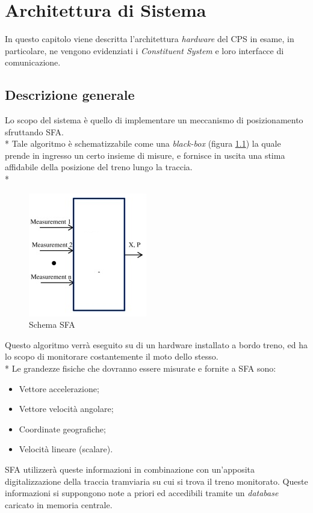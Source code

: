 \chapter{Architettura di Sistema}
In questo capitolo viene descritta l'architettura \emph{hardware} del CPS in esame, in particolare, ne vengono evidenziati i \emph{Constituent System} e loro interfacce di comunicazione.
\section{Descrizione generale}
Lo scopo del sistema \`e quello di implementare un meccanismo di posizionamento sfruttando SFA.\\*
Tale algoritmo \`e schematizzabile come una \emph{black-box} (figura \ref{fig:sfa}) la quale prende in ingresso un certo insieme di misure, e fornisce in uscita una stima affidabile della posizione del treno lungo la traccia.\\*
\begin{figure}[h]
	\centering
	\includegraphics{img/sfaschema}
	\caption{Schema SFA}
	\label{fig:sfa}
\end{figure}
\clearpage
Questo algoritmo verr\`a eseguito su di un hardware installato a bordo treno, ed ha lo scopo di monitorare costantemente il moto dello stesso.\\*
Le grandezze fisiche che dovranno essere misurate e fornite a SFA sono:
\begin{itemize}
	\item Vettore accelerazione;
	\item Vettore velocit\`a angolare;
	\item Coordinate geografiche;
	\item Velocit\`a lineare (scalare).
\end{itemize}
SFA utilizzer\`a queste informazioni in combinazione con un'apposita digitalizzazione della traccia tramviaria su cui si trova il treno monitorato. Queste informazioni si suppongono note a priori ed accedibili tramite un \emph{database} caricato in memoria centrale.
